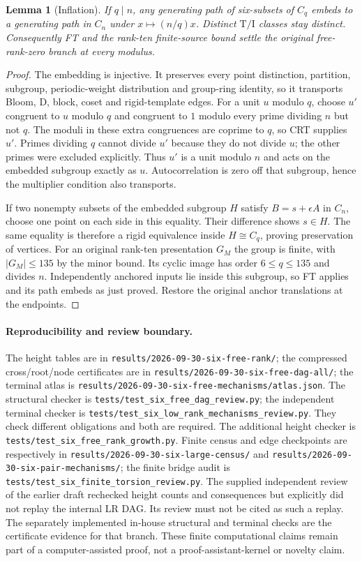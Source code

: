 \documentclass[11pt]{article}
\newtheorem{lemma}[theorem]{Lemma}
\theoremstyle{remark}
\newcommand{\TI}{\mathrm{T/I}}
\newcommand{\code}[1]{\nolinkurl{#1}}
\begin{document}
\begin{lemma}[Inflation]\label{lem:inflate}
If $q\mid n$, any generating path of six-subsets of $C_q$ embeds to
a generating path in $C_n$ under $x\mapsto(n/q)x$. Distinct $\TI$
classes stay distinct. Consequently FT and the rank-ten finite-source
bound settle the original free-rank-zero branch at every modulus.
\end{lemma}
\begin{proof}
The embedding is injective. It preserves every point distinction,
partition, subgroup, periodic-weight distribution and group-ring identity,
so it transports Bloom, D, block, coset and rigid-template edges. For a
unit $u$ modulo $q$, choose $u'$ congruent to $u$ modulo $q$ and congruent
to $1$ modulo every prime dividing $n$ but not $q$. The moduli in these
extra congruences are coprime to $q$, so CRT supplies $u'$. Primes dividing
$q$ cannot divide $u'$ because they do not divide $u$; the other primes
were excluded explicitly. Thus $u'$ is a unit modulo $n$ and acts on
the embedded subgroup exactly as $u$. Autocorrelation is zero off that
subgroup, hence the multiplier condition also transports.

If two nonempty subsets of the embedded subgroup $H$ satisfy
$B=s+\epsilon A$ in $C_n$, choose one point on each side in this equality.
Their difference shows $s\in H$. The same equality is therefore a rigid
equivalence inside $H\cong C_q$, proving preservation of vertices.
For an original rank-ten presentation $G_M$ the group is finite, with
$|G_M|\le135$ by the minor bound. Its cyclic image has order
$6\le q\le135$ and divides $n$. Independently anchored inputs lie
inside this subgroup, so FT applies and its path embeds as just proved.
Restore the original anchor translations at the endpoints.
\end{proof}

\paragraph{Reproducibility and review boundary.}
The height tables are in \code{results/2026-09-30-six-free-rank/};
the compressed cross/root/node certificates are in
\code{results/2026-09-30-six-free-dag-all/}; the terminal atlas is
\code{results/2026-09-30-six-free-mechanisms/atlas.json}.
The structural checker is \code{tests/test_six_free_dag_review.py};
the independent terminal checker is
\code{tests/test_six_low_rank_mechanisms_review.py}.
They check different obligations and both are required. The additional
height checker is \code{tests/test_six_free_rank_growth.py}.
Finite census and edge checkpoints are respectively in
\code{results/2026-09-30-six-large-census/} and
\code{results/2026-09-30-six-pair-mechanisms/}; the finite bridge audit is
\code{tests/test_six_finite_torsion_review.py}.
The supplied independent review of the earlier draft rechecked height
counts and consequences but explicitly did not replay the internal LR DAG.
Its review must not be cited as such a replay. The separately implemented
in-house structural and terminal checks are the certificate evidence for
that branch. These finite computational claims remain part of a
computer-assisted proof, not a proof-assistant-kernel or novelty claim.
\end{document}
